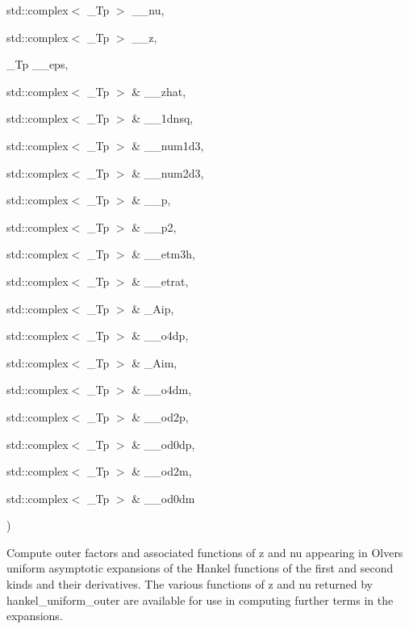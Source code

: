 {\begin{DoxyParamCaption}
\item[{std\+::complex$<$ \+\_\+\+Tp $>$}]{\+\_\+\+\_\+nu, }
\item[{std\+::complex$<$ \+\_\+\+Tp $>$}]{\+\_\+\+\_\+z, }
\item[{\+\_\+\+Tp}]{\+\_\+\+\_\+eps, }
\item[{std\+::complex$<$ \+\_\+\+Tp $>$ \&}]{\+\_\+\+\_\+zhat, }
\item[{std\+::complex$<$ \+\_\+\+Tp $>$ \&}]{\+\_\+\+\_\+1dnsq, }
\item[{std\+::complex$<$ \+\_\+\+Tp $>$ \&}]{\+\_\+\+\_\+num1d3, }
\item[{std\+::complex$<$ \+\_\+\+Tp $>$ \&}]{\+\_\+\+\_\+num2d3, }
\item[{std\+::complex$<$ \+\_\+\+Tp $>$ \&}]{\+\_\+\+\_\+p, }
\item[{std\+::complex$<$ \+\_\+\+Tp $>$ \&}]{\+\_\+\+\_\+p2, }
\item[{std\+::complex$<$ \+\_\+\+Tp $>$ \&}]{\+\_\+\+\_\+etm3h, }
\item[{std\+::complex$<$ \+\_\+\+Tp $>$ \&}]{\+\_\+\+\_\+etrat, }
\item[{std\+::complex$<$ \+\_\+\+Tp $>$ \&}]{\+\_\+\+Aip, }
\item[{std\+::complex$<$ \+\_\+\+Tp $>$ \&}]{\+\_\+\+\_\+o4dp, }
\item[{std\+::complex$<$ \+\_\+\+Tp $>$ \&}]{\+\_\+\+Aim, }
\item[{std\+::complex$<$ \+\_\+\+Tp $>$ \&}]{\+\_\+\+\_\+o4dm, }
\item[{std\+::complex$<$ \+\_\+\+Tp $>$ \&}]{\+\_\+\+\_\+od2p, }
\item[{std\+::complex$<$ \+\_\+\+Tp $>$ \&}]{\+\_\+\+\_\+od0dp, }
\item[{std\+::complex$<$ \+\_\+\+Tp $>$ \&}]{\+\_\+\+\_\+od2m, }
\item[{std\+::complex$<$ \+\_\+\+Tp $>$ \&}]{\+\_\+\+\_\+od0dm}
\end{DoxyParamCaption}
)}\hypertarget{namespacestd_1_1____detail_a099751f2a153283d91f19d6efa52117a}{}\label{namespacestd_1_1____detail_a099751f2a153283d91f19d6efa52117a}


Compute outer factors and associated functions of {\ttfamily z} and {\ttfamily nu} appearing in Olver\textquotesingle{}s uniform asymptotic expansions of the Hankel functions of the first and second kinds and their derivatives. The various functions of z and nu returned by {\ttfamily hankel\+\_\+uniform\+\_\+outer} are available for use in computing further terms in the expansions. 



